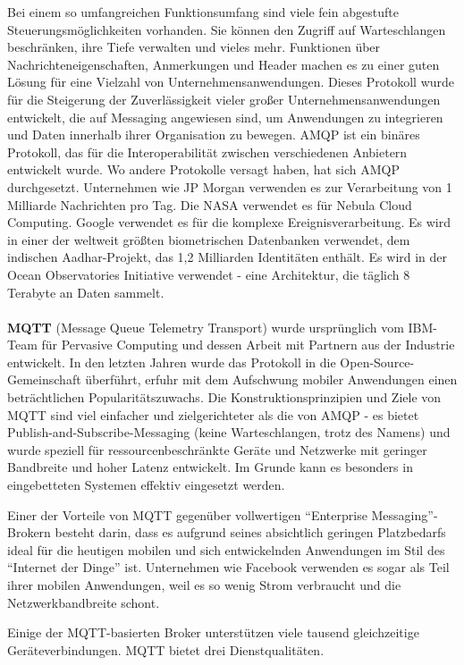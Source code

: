 \documentclass[../vs-script-first-v01.tex]{subfiles}
\begin{document}
Bei einem so umfangreichen Funktionsumfang sind viele fein abgestufte Steuerungsmöglichkeiten vorhanden. Sie können den Zugriff auf Warteschlangen beschränken, ihre Tiefe verwalten und vieles mehr. Funktionen über Nachrichteneigenschaften, Anmerkungen und Header machen es zu einer guten Lösung für eine Vielzahl von Unternehmensanwendungen. Dieses Protokoll wurde für die Steigerung der Zuverlässigkeit vieler großer Unternehmensanwendungen entwickelt, die auf Messaging angewiesen sind, um Anwendungen zu integrieren und Daten innerhalb ihrer Organisation zu bewegen. AMQP ist ein binäres Protokoll, das für die Interoperabilität zwischen verschiedenen Anbietern entwickelt wurde. Wo andere Protokolle versagt haben, hat sich AMQP durchgesetzt. Unternehmen wie JP Morgan verwenden es zur Verarbeitung von 1 Milliarde Nachrichten pro Tag. Die NASA verwendet es für Nebula Cloud Computing. Google verwendet es für die komplexe Ereignisverarbeitung. Es wird in einer der weltweit größten biometrischen Datenbanken verwendet, dem indischen Aadhar-Projekt, das 1,2 Milliarden Identitäten enthält. Es wird in der Ocean Observatories Initiative verwendet - eine Architektur, die täglich 8 Terabyte an Daten sammelt. 
\\\\
\textbf{MQTT} (Message Queue Telemetry Transport) wurde ursprünglich vom IBM-Team für Pervasive Computing und dessen Arbeit mit Partnern aus der Industrie entwickelt. In den letzten Jahren wurde das Protokoll in die Open-Source-Gemeinschaft überführt, erfuhr mit dem Aufschwung mobiler Anwendungen einen beträchtlichen Popularitätszuwachs. Die Konstruktionsprinzipien und Ziele von MQTT sind viel einfacher und zielgerichteter als die von AMQP - es bietet Publish-and-Subscribe-Messaging (keine Warteschlangen, trotz des Namens) und wurde speziell für ressourcenbeschränkte Geräte und Netzwerke mit geringer Bandbreite und hoher Latenz entwickelt. Im Grunde kann es besonders in eingebetteten Systemen effektiv eingesetzt werden.

Einer der Vorteile von MQTT gegenüber vollwertigen \enquote{Enterprise Messaging}-Brokern besteht darin, dass es aufgrund seines absichtlich geringen Platzbedarfs ideal für die heutigen mobilen und sich entwickelnden Anwendungen im Stil des \enquote{Internet der Dinge} ist. Unternehmen wie Facebook verwenden es sogar als Teil ihrer mobilen Anwendungen, weil es so wenig Strom verbraucht und die Netzwerkbandbreite schont.

Einige der MQTT-basierten Broker unterstützen viele tausend gleichzeitige Geräteverbindungen. MQTT bietet drei Dienstqualitäten.
\end{document}
